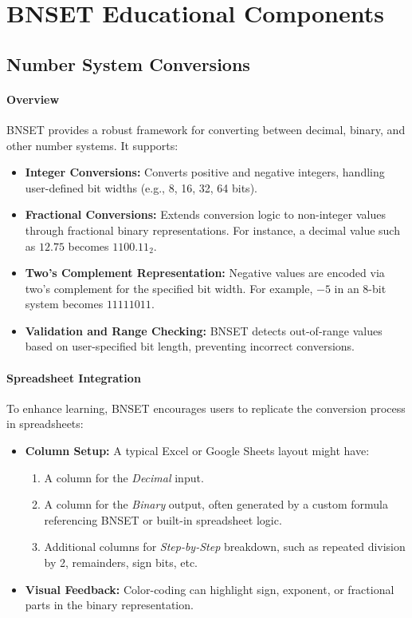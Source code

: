 \documentclass{article}
\begin{document}
\section{BNSET Educational Components}

\subsection{Number System Conversions}
\label{sec:number-system-conversions}
\paragraph{Overview}
BNSET provides a robust framework for converting between decimal, binary, and other number systems. It supports:
\begin{itemize}
  \item \textbf{Integer Conversions:} Converts positive and negative integers, handling user-defined bit widths (e.g., 8, 16, 32, 64 bits).
  \item \textbf{Fractional Conversions:} Extends conversion logic to non-integer values through fractional binary representations. For instance, a decimal value such as $12.75$ becomes $1100.11_{2}$.
  \item \textbf{Two's Complement Representation:} Negative values are encoded via two's complement for the specified bit width. For example, $-5$ in an 8-bit system becomes $11111011$.
  \item \textbf{Validation and Range Checking:} BNSET detects out-of-range values based on user-specified bit length, preventing incorrect conversions.
\end{itemize}

\paragraph{Spreadsheet Integration}
To enhance learning, BNSET encourages users to replicate the conversion process in spreadsheets:
\begin{itemize}
  \item \textbf{Column Setup:} A typical Excel or Google Sheets layout might have:
  \begin{enumerate}
    \item A column for the \textit{Decimal} input.
    \item A column for the \textit{Binary} output, often generated by a custom formula referencing BNSET or built-in spreadsheet logic.
    \item Additional columns for \textit{Step-by-Step} breakdown, such as repeated division by 2, remainders, sign bits, etc.
  \end{enumerate}
  \item \textbf{Visual Feedback:} Color-coding can highlight sign, exponent, or fractional parts in the binary representation.
\end{itemize}
\end{document}
